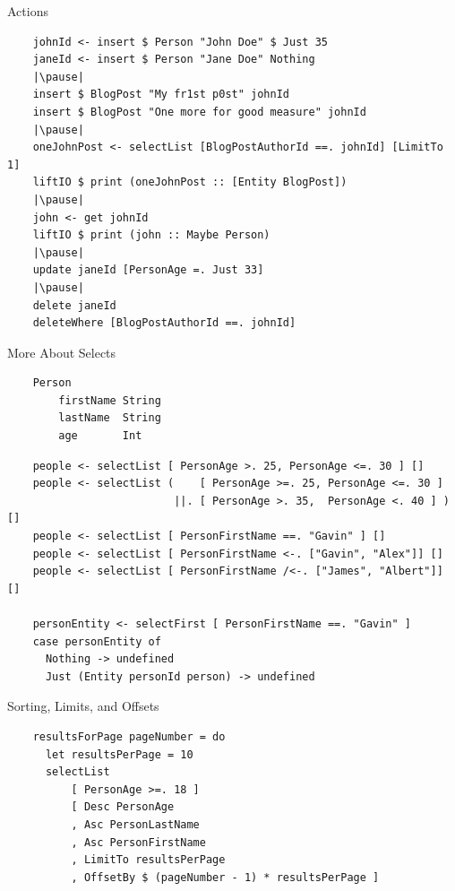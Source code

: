 \documentclass[pdf]{beamer}
\begin{document}
\begin{frame}[fragile]{Actions}
  \begin{verbatim}
    johnId <- insert $ Person "John Doe" $ Just 35
    janeId <- insert $ Person "Jane Doe" Nothing
    |\pause|
    insert $ BlogPost "My fr1st p0st" johnId
    insert $ BlogPost "One more for good measure" johnId
    |\pause|
    oneJohnPost <- selectList [BlogPostAuthorId ==. johnId] [LimitTo 1]
    liftIO $ print (oneJohnPost :: [Entity BlogPost])
    |\pause|
    john <- get johnId
    liftIO $ print (john :: Maybe Person)
    |\pause|
    update janeId [PersonAge =. Just 33]
    |\pause|
    delete janeId
    deleteWhere [BlogPostAuthorId ==. johnId]
  \end{verbatim}
\end{frame}

\begin{frame}[fragile]{More About Selects}
  \begin{verbatim}
    Person
        firstName String
        lastName  String
        age       Int
  \end{verbatim}
  \pause
  \begin{verbatim}
    people <- selectList [ PersonAge >. 25, PersonAge <=. 30 ] []
    people <- selectList (    [ PersonAge >=. 25, PersonAge <=. 30 ]
                          ||. [ PersonAge >. 35,  PersonAge <. 40 ] ) []
    people <- selectList [ PersonFirstName ==. "Gavin" ] []
    people <- selectList [ PersonFirstName <-. ["Gavin", "Alex"]] []
    people <- selectList [ PersonFirstName /<-. ["James", "Albert"]] []

    personEntity <- selectFirst [ PersonFirstName ==. "Gavin" ]
    case personEntity of
      Nothing -> undefined
      Just (Entity personId person) -> undefined
  \end{verbatim}
\end{frame}

\begin{frame}[fragile]{Sorting, Limits, and Offsets}
  \begin{verbatim}
    resultsForPage pageNumber = do
      let resultsPerPage = 10
      selectList
          [ PersonAge >=. 18 ]
          [ Desc PersonAge
          , Asc PersonLastName
          , Asc PersonFirstName
          , LimitTo resultsPerPage
          , OffsetBy $ (pageNumber - 1) * resultsPerPage ]
  \end{verbatim}
\end{frame}
\end{document}
